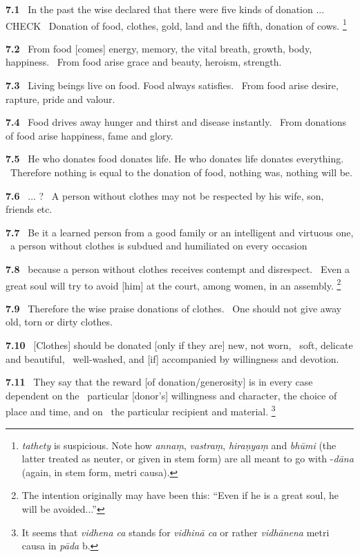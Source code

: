 \documentclass{article}
\newcommand{\skt}[1]{\textit{#1}}
\begin{document}
\textbf{7.1}%
\ In the past the wise declared that there were five kinds of donation ... CHECK%
\ Donation of food, clothes, gold, land and the fifth, donation of cows.%
\footnote{\skt{tathety} is suspicious. Note how \skt{annaṃ}, \skt{vastraṃ}, \skt{hiraṇyaṃ} and \skt{bhūmi} (the latter treated as neuter, or given in                                stem form) are all meant to go with -\skt{dāna} (again, in stem form, metri causa). }%


\textbf{7.2}%
\ From food [comes] energy, memory, the vital breath, growth, body, happiness.%
\ From food arise grace and beauty, heroism, strength.%


\textbf{7.3}%
\ Living beings live on food. Food always satisfies.%
\ From food arise desire, rapture, pride and valour.%


\textbf{7.4}%
\ Food drives away hunger and thirst and disease instantly.%
\ From donations of food arise happiness, fame and glory.%


\textbf{7.5}%
\ He who donates food donates life. He who donates life donates everything.%
\ Therefore nothing is equal to the donation of food, nothing was, nothing will be.%


\textbf{7.6}%
\ ...  ?%
\ A person without clothes may not be respected by his wife, son, friends etc.%


\textbf{7.7}%
\ Be it a learned person from a good family or an intelligent and virtuous one,%
\ a person without clothes is subdued and humiliated on every occasion%


\textbf{7.8}%
\ because a person without clothes receives contempt and disrespect.%
\ Even a great soul will try to avoid [him] at the court, among women, in an assembly.%
\footnote{The intention originally may have been this: ``Even if he is a great soul, he will be avoided...'' }%


\textbf{7.9}%
\ Therefore the wise praise donations of clothes.%
\ One should not give away old, torn or dirty clothes.%


\textbf{7.10}%
\ [Clothes] should be donated [only if they are] new, not worn,%
\                  soft, delicate and beautiful,%
\ well-washed, and [if] accompanied by willingness and devotion.%


\textbf{7.11}%
\ They say that the reward [of donation/generosity] is in every case dependent on the%
\                 particular [donor's] willingness and character, the choice of place and time, and on%
\                 the particular recipient and material.%
\footnote{It seems that \skt{vidhena ca} stands for \skt{vidhinā ca} or rather \skt{vidhānena} metri causa in \skt{pāda} b. }%
\end{document}
